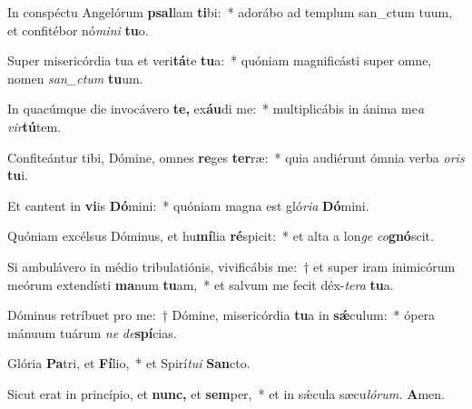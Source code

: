 \item In conspéctu Angelórum \textbf{psal}lam \textbf{ti}bi:~* adorábo ad templum san\_ctum tuum, et confitébor nó\textit{mini} \textbf{tu}o.
\item Super misericórdia tua et veri\textbf{tá}te \textbf{tu}a:~* quóniam magnificásti super omne, nomen \textit{san\_ctum} \textbf{tu}um.
\item In quacúmque die invocávero \textbf{te,} ex\textbf{áu}di me:~* multiplicábis in ánima me\tinyhspace\textit{a} \textit{vir}\textbf{tú}tem.
\item Confiteántur tibi, Dómine, omnes \textbf{re}ges \textbf{ter}ræ:~* quia audiérunt ó\-mnia verba \textit{oris} \textbf{tu}i.
\item Et cantent in \textbf{vi}is \textbf{Dó}mini:~* quóniam magna est gló\textit{ria} \textbf{Dó}mini.
\item Quóniam excélsus Dóminus, et hu\textbf{mí}lia \textbf{ré}spicit:~* et alta a lon\textit{ge} \textit{co}\textbf{gnó}scit.
\item Si ambulávero in médio tribulatiónis, vivificábis me:~† et super iram inimicórum meórum extendísti \textbf{ma}num \textbf{tu}am,~* et salvum me fecit 
déx-\textit{tera} \textbf{tu}a.
\item Dóminus retríbuet pro me:~† Dómine, misericórdia \textbf{tu}a in \textbf{sǽ}culum:~* ópera mánuum tuárum \textit{ne} \textit{de}\textbf{spí}cias.
\item Glória \textbf{Pa}tri, et \textbf{Fí}lio,~* et Spirí\tinyhspace\textit{tui} \textbf{San}cto.
\item Sicut erat in princípio, et \textbf{nunc,} et \textbf{sem}per,~* et in sǽcula sæcu\tinyhspace\textit{lórum.} \textbf{A}men.